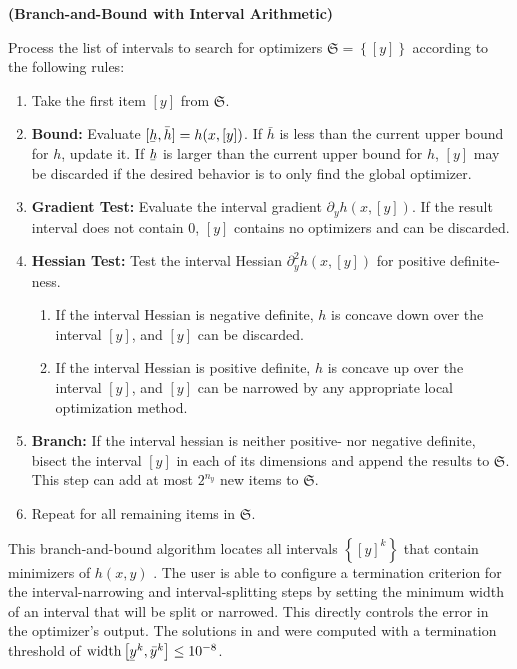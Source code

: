 \documentclass[twoside,leqno, twocolumn]{article}
\newcommand{\frS}{\ensuremath{\mathfrak{S}}}
\newcommand\ubar[1]{\underaccent{\bar}{#1}}
\begin{document}
\begin{algorithm}
	\label{algo:bnb-ia}
	\textbf{(Branch-and-Bound with Interval Arithmetic)}
	
	Process the list of intervals to search for optimizers $\frS = \left\{[y]\right\}$ according to the following rules:
	\begin{enumerate} 
		\item Take the first item $[y]$ from $\frS$.
		\item \textbf{Bound:} Evaluate $[\ubar h, \bar h] = h(x, [y])$. If $\bar h$ is less than the current upper bound for $h$, update it. If $\ubar h$ is larger than the current upper bound for $h$, $[y]$ may be discarded if the desired behavior is to only find the global optimizer.
		\item \textbf{Gradient Test:} Evaluate the interval gradient $\partial_y h(x, [y])$. If the result interval does not contain $0$, $[y]$ contains no optimizers and can be discarded.
		\item \textbf{Hessian Test:} Test the interval Hessian $\partial^2_y h(x, [y])$ for positive definite-ness.
		\begin{enumerate}
			\item If the interval Hessian is negative definite, $h$ is concave down over the interval $[y]$, and $[y]$ can be discarded.
			\item If the interval Hessian is positive definite, $h$ is concave up over the interval $[y]$, and $[y]$ can be narrowed by any appropriate local optimization method.
		\end{enumerate}
		\item \textbf{Branch:} If the interval hessian is neither positive- nor negative definite, bisect the interval $[y]$ in each of its dimensions and append the results to $\frS$. This step can add at most $2^{n_y}$ new items to $\frS$.
		\item Repeat for all remaining items in $\frS$.
	\end{enumerate}
\end{algorithm}
This branch-and-bound algorithm locates all intervals $\left\{[y]^k\right\}$ that contain minimizers of $h(x, y)$ \cite{rallGlobalOptimizationUsing1985, deussenGlobalSearchLocal2020}. The user is able to configure a termination criterion for the interval-narrowing and interval-splitting steps by setting the minimum width of an interval that will be split or narrowed. This directly controls the error in the optimizer's output. The solutions in  and  were computed with a termination threshold of $\mathrm{width}\left[\ubar y^k, \bar y^k\right] \leq 10^{-8}$.
\end{document}

